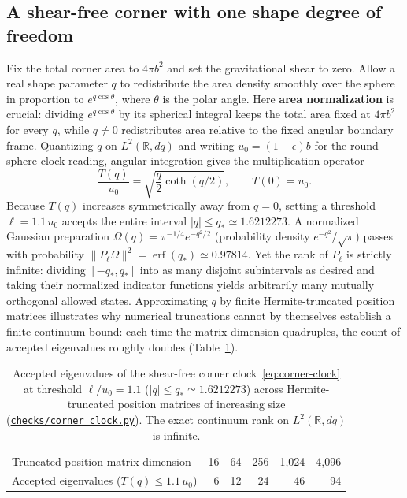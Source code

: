 \documentclass[10pt,a4paper]{article}
\newcommand{\repo}[2]{\href{https://github.com/sprajs/quantum-gravity/blob/main/#1}{#2}}
\begin{document}
\subsection{A shear-free corner with one shape degree of freedom}
\label{subsec:shape-model}
Fix the total corner area to $4\pi b^2$ and set the gravitational shear to zero. Allow a real shape parameter $q$ to redistribute the area density smoothly over the sphere in proportion to $e^{q\cos\theta}$, where $\theta$ is the polar angle. Here \textbf{area normalization} is crucial: dividing $e^{q\cos\theta}$ by its spherical integral keeps the total area fixed at $4\pi b^2$ for every $q$, while $q \ne 0$ redistributes area relative to the fixed angular boundary frame. Quantizing $q$ on $L^2(\mathbb{R}, dq)$ and writing $u_0 = (1-\epsilon)b$ for the round-sphere clock reading, angular integration gives the multiplication operator
\begin{equation}
  \frac{T(q)}{u_0} = \sqrt{\frac{q}{2}\coth(q/2)},
  \qquad
  T(0) = u_0.
  \label{eq:corner-clock}
\end{equation}
Because $T(q)$ increases symmetrically away from $q=0$, setting a threshold $\ell = 1.1\,u_0$ accepts the entire interval $|q| \le q_* \simeq 1.6212273$. A normalized Gaussian preparation $\Omega(q) = \pi^{-1/4} e^{-q^2/2}$ (probability density $e^{-q^2}/\sqrt{\pi}$) passes with probability $\|P_\ell\Omega\|^2 = \operatorname{erf}(q_*) \simeq 0.97814$. Yet the rank of $P_\ell$ is strictly infinite: dividing $[-q_*, q_*]$ into as many disjoint subintervals as desired and taking their normalized indicator functions yields arbitrarily many mutually orthogonal allowed states. Approximating $q$ by finite Hermite-truncated position matrices illustrates why numerical truncations cannot by themselves establish a finite continuum bound: each time the matrix dimension quadruples, the count of accepted eigenvalues roughly doubles (Table~\ref{tab:corner-clock}).

\begin{table}[htbp]
  \centering
  \caption{Accepted eigenvalues of the shear-free corner clock~\eqref{eq:corner-clock} at threshold $\ell/u_0 = 1.1$ ($|q| \le q_* \simeq 1.6212273$) across Hermite-truncated position matrices of increasing size (\repo{checks/corner_clock.py}{\texttt{checks/corner\_clock.py}}). The exact continuum rank on $L^2(\mathbb{R}, dq)$ is infinite.}
  \label{tab:corner-clock}
  \small
  \begin{tabular}{@{}lrrrrr@{}}
    \toprule
    Truncated position-matrix dimension & 16 & 64 & 256 & 1,024 & 4,096 \\
    Accepted eigenvalues ($T(q) \le 1.1\,u_0$) & 6 & 12 & 24 & 46 & 94 \\
    \bottomrule
  \end{tabular}
\end{table}
\end{document}
